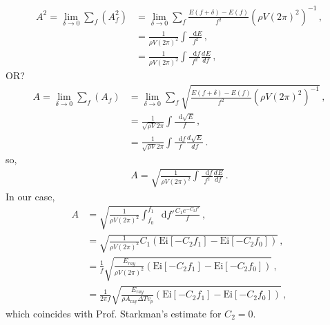 \documentclass{article}
\newcommand*\diff{\mathop{}\!\mathrm{d}}
\newcommand*\te[1]{\text{#1}}
\newcommand*\p[1]{\left(#1\right)}
\newcommand*\ps[1]{\left[#1\right]}
\newcommand*\f[2]{\frac{#1}{#2}}
\newcommand*\td[3]{\frac{d^{#3}#1}{d #2^{#3}}}
\begin{document}
\begin{align}
A^2 = \lim_{\delta\to 0}\sum_f (A_f^2) &= \lim_{\delta\to 0}\sum_f \f{E(f+\delta)-E(f)}{f^2}\p{\rho V  (2\pi)^2}^{-1}\,,\\
&=\f{1}{\rho V  (2\pi)^2} \int \f{\diff E}{f^2}\,,\\
&=\f{1}{\rho V  (2\pi)^2} \int \f{\diff f}{f^2}\td{E}{f}{}\,,
\end{align}
OR?
\begin{align}
A = \lim_{\delta\to 0}\sum_f (A_f) &= \lim_{\delta\to 0}\sum_f\sqrt{ \f{E(f+\delta)-E(f)}{f^2}\p{\rho V  (2\pi)^2}^{-1}}\,,\\
&=\f{1}{\sqrt{\rho V}  2\pi} \int \f{\diff \sqrt{E}}{f}\,,\\
&=\f{1}{\sqrt{\rho V}  2\pi} \int \f{\diff f}{f}\td{\sqrt{E}}{f}{}\,.
\end{align}
so,
\begin{align}
A = \sqrt{\f{1}{\rho V  (2\pi)^2} \int \f{\diff f}{f^2}\td{E}{f}{}}\,.
\end{align}
In our case,
\begin{align}
A &= \sqrt{\f{1}{\rho V  (2\pi)^2} \int_{f_0}^{f_1} \diff f' \f{C_1 e^{-C_2 f'}}{f}}\,,\\
&= \sqrt{\f{1}{\rho V  (2\pi)^2}C_1\p{\te{Ei}\ps{-C_2f_1}-\te{Ei}\ps{-C_2f_0}}}\,,\\
&= \f{1}{f}\sqrt{\f{E_{ray}}{\rho V  (2\pi)^2}\p{\te{Ei}\ps{-C_2f_1}-\te{Ei}\ps{-C_2f_0}}}\,,\\
&= \f{1}{2\pi f}\sqrt{\f{E_{ray}}{\rho A_{\te{ray}}\Delta T v_p}\p{\te{Ei}\ps{-C_2f_1}-\te{Ei}\ps{-C_2f_0}}}\,,
\end{align}
which coincides with Prof. Starkman's estimate for $C_2 = 0$.
\pagebreak
\end{document}
